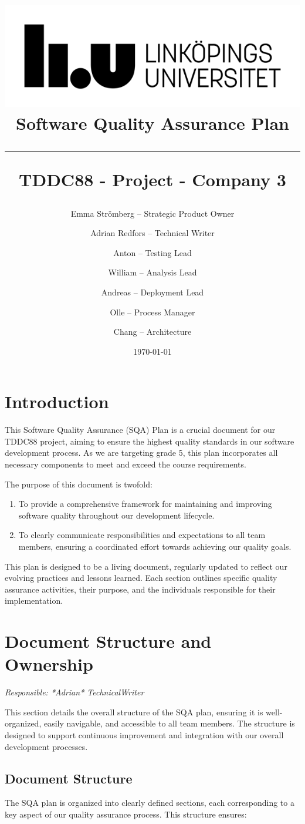 \documentclass{article}
\title{
\includegraphics[scale=1.5]{liu_logga.png} \\
\vspace{2.0cm} \textbf{Software Quality Assurance Plan} \\
 \endgraf\rule{\textwidth}{.4pt}
  \large \textbf{TDDC88 - Project - Company 3}\\
   }
\author{
    Emma Strömberg -- Strategic Product Owner \and 
    Adrian Redfors -- Technical Writer \and 
    Anton -- Testing Lead \and 
    William -- Analysis Lead \and 
    Andreas -- Deployment Lead \and 
    Olle -- Process Manager \and 
    Chang -- Architecture
}
\date{\today}
\begin{document}
\maketitle

\newpage
\tableofcontents
\newpage

\section{Introduction}
This Software Quality Assurance (SQA) Plan is a crucial document for our TDDC88 project, aiming to ensure the highest quality standards in our software development process. As we are targeting grade 5, this plan incorporates all necessary components to meet and exceed the course requirements.

The purpose of this document is twofold:
\begin{enumerate}
    \item To provide a comprehensive framework for maintaining and improving software quality throughout our development lifecycle.
    \item To clearly communicate responsibilities and expectations to all team members, ensuring a coordinated effort towards achieving our quality goals.
\end{enumerate}

This plan is designed to be a living document, regularly updated to reflect our evolving practices and lessons learned. Each section outlines specific quality assurance activities, their purpose, and the individuals responsible for their implementation.


\section{Document Structure and Ownership}
\textit{Responsible: *Adrian* TechnicalWriter}

This section details the overall structure of the SQA plan, ensuring it is well-organized, easily navigable, and accessible to all team members. The structure is designed to support continuous improvement and integration with our overall development processes.

\subsection{Document Structure}
The SQA plan is organized into clearly defined sections, each corresponding to a key aspect of our quality assurance process. This structure ensures:
\end{document}

